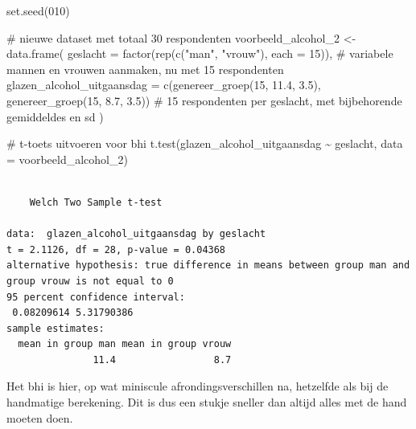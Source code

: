 \documentclass[
  letterpaper,
  DIV=11,
  numbers=noendperiod]{scrreprt}
\newenvironment{Shaded}{\begin{snugshade}}{\end{snugshade}}
\newcommand{\AttributeTok}[1]{\textcolor[rgb]{0.40,0.45,0.13}{#1}}
\newcommand{\CommentTok}[1]{\textcolor[rgb]{0.37,0.37,0.37}{#1}}
\newcommand{\DecValTok}[1]{\textcolor[rgb]{0.68,0.00,0.00}{#1}}
\newcommand{\FloatTok}[1]{\textcolor[rgb]{0.68,0.00,0.00}{#1}}
\newcommand{\FunctionTok}[1]{\textcolor[rgb]{0.28,0.35,0.67}{#1}}
\newcommand{\NormalTok}[1]{\textcolor[rgb]{0.00,0.23,0.31}{#1}}
\newcommand{\OtherTok}[1]{\textcolor[rgb]{0.00,0.23,0.31}{#1}}
\newcommand{\SpecialCharTok}[1]{\textcolor[rgb]{0.37,0.37,0.37}{#1}}
\newcommand{\StringTok}[1]{\textcolor[rgb]{0.13,0.47,0.30}{#1}}
\begin{document}
\begin{Shaded}
\begin{Highlighting}[]
\FunctionTok{set.seed}\NormalTok{(}\DecValTok{010}\NormalTok{)}

\CommentTok{\# nieuwe dataset met totaal 30 respondenten}
\NormalTok{voorbeeld\_alcohol\_2 }\OtherTok{\textless{}{-}} \FunctionTok{data.frame}\NormalTok{(}
  \AttributeTok{geslacht                     =}  \FunctionTok{factor}\NormalTok{(}\FunctionTok{rep}\NormalTok{(}\FunctionTok{c}\NormalTok{(}\StringTok{"man"}\NormalTok{, }\StringTok{"vrouw"}\NormalTok{), }\AttributeTok{each =} \DecValTok{15}\NormalTok{)), }\CommentTok{\# variabele mannen en vrouwen aanmaken, nu met 15 respondenten}
  \AttributeTok{glazen\_alcohol\_uitgaansdag   =} 
    \FunctionTok{c}\NormalTok{(}\FunctionTok{genereer\_groep}\NormalTok{(}\DecValTok{15}\NormalTok{, }\FloatTok{11.4}\NormalTok{, }\FloatTok{3.5}\NormalTok{), }\FunctionTok{genereer\_groep}\NormalTok{(}\DecValTok{15}\NormalTok{, }\FloatTok{8.7}\NormalTok{, }\FloatTok{3.5}\NormalTok{)) }\CommentTok{\# 15 respondenten per geslacht, met bijbehorende gemiddeldes en sd}
\NormalTok{)}
\end{Highlighting}
\end{Shaded}

\begin{Shaded}
\begin{Highlighting}[]
\CommentTok{\# t{-}toets uitvoeren voor bhi}
\FunctionTok{t.test}\NormalTok{(glazen\_alcohol\_uitgaansdag }\SpecialCharTok{\textasciitilde{}}\NormalTok{ geslacht,}
       \AttributeTok{data =}\NormalTok{ voorbeeld\_alcohol\_2) }
\end{Highlighting}
\end{Shaded}

\begin{verbatim}

    Welch Two Sample t-test

data:  glazen_alcohol_uitgaansdag by geslacht
t = 2.1126, df = 28, p-value = 0.04368
alternative hypothesis: true difference in means between group man and group vrouw is not equal to 0
95 percent confidence interval:
 0.08209614 5.31790386
sample estimates:
  mean in group man mean in group vrouw 
               11.4                 8.7 
\end{verbatim}

Het bhi is hier, op wat miniscule afrondingsverschillen na, hetzelfde
als bij de handmatige berekening. Dit is dus een stukje sneller dan
altijd alles met de hand moeten doen.
\end{document}
